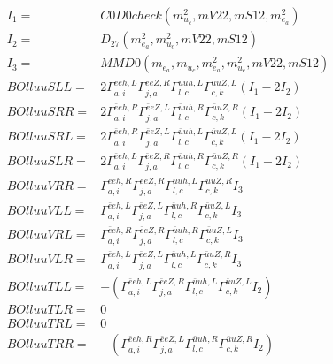 \documentclass[A4,landscape]{article}
\begin{document}
\begin{align} 
I_1 = & C0D0check(m^2_{u_{{c}}}, mV22, mS12, m^2_{e_{{a}}}) \\ 
I_2 = & D_{27}(m^2_{e_{{a}}}, m^2_{u_{{c}}}, mV22, mS12) \\ 
I_3 = & MMD0(m_{e_{{a}}}, m_{u_{{c}}}, m^2_{e_{{a}}}, m^2_{u_{{c}}}, mV22, mS12) \\ 
  BOlluuSLL= & 2  \Gamma^{\bar{e}e h ,L}_{a, i} \Gamma^{\bar{e}e Z ,R}_{j, a} \Gamma^{\bar{u}u h ,L}_{l, c} \Gamma^{\bar{u}u Z ,L}_{c, k} (I_1 - 2 I_2) \\ 
  BOlluuSRR= & 2  \Gamma^{\bar{e}e h ,R}_{a, i} \Gamma^{\bar{e}e Z ,L}_{j, a} \Gamma^{\bar{u}u h ,R}_{l, c} \Gamma^{\bar{u}u Z ,R}_{c, k} (I_1 - 2 I_2) \\ 
  BOlluuSRL= & 2  \Gamma^{\bar{e}e h ,R}_{a, i} \Gamma^{\bar{e}e Z ,L}_{j, a} \Gamma^{\bar{u}u h ,L}_{l, c} \Gamma^{\bar{u}u Z ,L}_{c, k} (I_1 - 2 I_2) \\ 
  BOlluuSLR= & 2  \Gamma^{\bar{e}e h ,L}_{a, i} \Gamma^{\bar{e}e Z ,R}_{j, a} \Gamma^{\bar{u}u h ,R}_{l, c} \Gamma^{\bar{u}u Z ,R}_{c, k} (I_1 - 2 I_2) \\ 
  BOlluuVRR= &  \Gamma^{\bar{e}e h ,R}_{a, i} \Gamma^{\bar{e}e Z ,R}_{j, a} \Gamma^{\bar{u}u h ,L}_{l, c} \Gamma^{\bar{u}u Z ,R}_{c, k} I_3 \\ 
  BOlluuVLL= &  \Gamma^{\bar{e}e h ,L}_{a, i} \Gamma^{\bar{e}e Z ,L}_{j, a} \Gamma^{\bar{u}u h ,R}_{l, c} \Gamma^{\bar{u}u Z ,L}_{c, k} I_3 \\ 
  BOlluuVRL= &  \Gamma^{\bar{e}e h ,R}_{a, i} \Gamma^{\bar{e}e Z ,R}_{j, a} \Gamma^{\bar{u}u h ,R}_{l, c} \Gamma^{\bar{u}u Z ,L}_{c, k} I_3 \\ 
  BOlluuVLR= &  \Gamma^{\bar{e}e h ,L}_{a, i} \Gamma^{\bar{e}e Z ,L}_{j, a} \Gamma^{\bar{u}u h ,L}_{l, c} \Gamma^{\bar{u}u Z ,R}_{c, k} I_3 \\ 
  BOlluuTLL= & -( \Gamma^{\bar{e}e h ,L}_{a, i} \Gamma^{\bar{e}e Z ,R}_{j, a} \Gamma^{\bar{u}u h ,L}_{l, c} \Gamma^{\bar{u}u Z ,L}_{c, k} I_2) \\ 
  BOlluuTLR= & 0 \\ 
  BOlluuTRL= & 0 \\ 
  BOlluuTRR= & -( \Gamma^{\bar{e}e h ,R}_{a, i} \Gamma^{\bar{e}e Z ,L}_{j, a} \Gamma^{\bar{u}u h ,R}_{l, c} \Gamma^{\bar{u}u Z ,R}_{c, k} I_2) \\ 
\end{align} 
\end{document}
